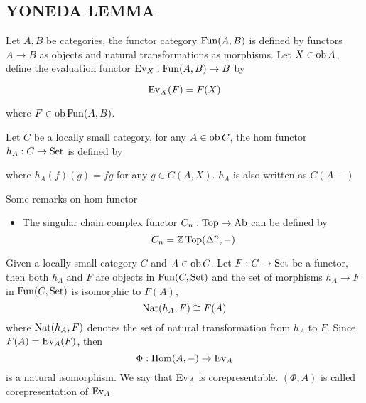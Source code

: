 \documentclass{report}
\begin{document}
\subsection{YONEDA LEMMA}

\begin{definition}
    Let $A, B$ be categories, the functor category $\operatorname{Fun}(A, B)$ is defined by functors $A \to B$ as objects and natural transformations as morphisms. Let $X \in \operatorname{ob} A$, define the evaluation functor $\operatorname{Ev}_X: \operatorname{Fun} (A, B) \to B$ by
    
    $$
        \operatorname{Ev}_X(F) = F(X)
    $$
    
    where $F \in \operatorname{ob} \operatorname{Fun} (A, B)$. 
\end{definition}

\begin{definition}
    Let $C$ be a locally small category, for any $A \in \operatorname{ob} C$, the hom functor $h_A: C \to \operatorname{Set}$ is defined by
    \begin{center}
    \end{center}
    where $h_A(f)(g) = f g$ for any $g \in C(A, X)$. $h_A$ is also written as $C(A, -)$
\end{definition}

\begin{remark}
    Some remarks on hom functor
    \begin{itemize}
        \item The singular chain complex functor $C_n: \operatorname{Top} \to \operatorname{Ab}$ can be defined by
        $$
            C_n = \mathbb{Z} \operatorname{Top}(\Delta^n, -)
        $$
    \end{itemize}
\end{remark}

\begin{theorem}
    Given a locally small category $C$ and $A \in \operatorname{ob} C$. Let $F: C \to \operatorname{Set}$ be a functor, then both $h_A$ and $F$ are objects in $\operatorname{Fun}(C, \operatorname{Set})$ and the set of morphisms $h_A \to F$ in $\operatorname{Fun}(C, \operatorname{Set})$ is isomorphic to $F(A)$,
    $$
        \operatorname{Nat}(h_A, F) \cong F(A)
    $$
    where $\operatorname{Nat}(h_A, F)$ denotes the set of natural transformation from $h_A$ to $F$. Since, $F(A) = \operatorname{Ev}_A (F)$, then
    $$
        \Phi: \operatorname{Hom}(A, -) \to \operatorname{Ev}_A
    $$
    is a natural isomorphism. We say that $\operatorname{Ev}_A$ is corepresentable. $(\Phi, A)$ is called corepresentation of $\operatorname{Ev}_A$
\end{theorem}
\end{document}
